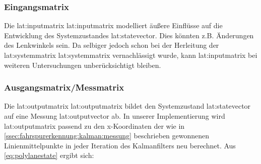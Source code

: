 \subsubsection{Eingangsmatrix}
Die \glsdesc{lat:inputmatrix} \gls{lat:inputmatrix} modelliert äußere Einflüsse auf die Entwicklung des Systemzustandes \gls{lat:statevector}. Dies könnten z.B. Änderungen des Lenkwinkels sein. Da selbiger jedoch schon bei der Herleitung der \glsdesc{lat:systemmatrix} \gls{lat:systemmatrix} vernachlässigt wurde, kann \gls{lat:inputmatrix} bei weiteren Untersuchungen unberücksichtigt bleiben.

\subsubsection{Ausgangsmatrix/Messmatrix} 
\label{sssec:fahrspurerkennung:kalman-filter:zustandsraumbeschreibung:outputmatrix}
Die \glsdesc{lat:outputmatrix} \gls{lat:outputmatrix} bildet den Systemzustand \gls{lat:statevector} auf eine Messung \gls{lat:outputvector} ab. In unserer Implementierung wird  \gls{lat:outputmatrix} passend zu den \gls{x}-Koordinaten der wie in \ref{ssec:fahrspurerkennung:kalman:messung} beschrieben gewonnenen Linienmittelpunkte in jeder Iteration des Kalmanfilters neu berechnet. Aus \ref{eq:polylanestate} ergibt sich:
